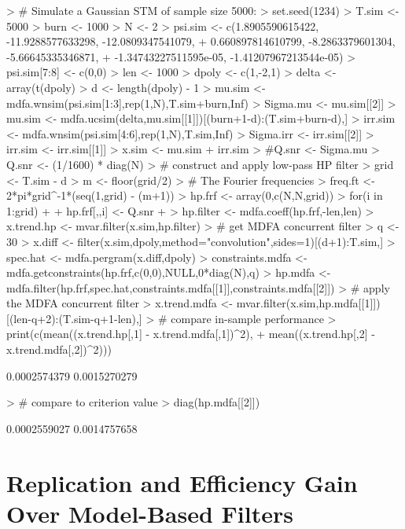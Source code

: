 \documentclass[a4paper]{book}
\begin{document}
\begin{Schunk}
\begin{Sinput}
> # Simulate a Gaussian STM  of sample size 5000:
> set.seed(1234)
> T.sim <- 5000
> burn <- 1000
> N <- 2
> psi.sim <- c(1.8905590615422, -11.9288577633298, -12.0809347541079, 
+              0.660897814610799, -8.2863379601304, -5.66645335346871, 
+              -1.34743227511595e-05, -1.41207967213544e-05)
> psi.sim[7:8] <- c(0,0)
> len <- 1000
> dpoly <- c(1,-2,1)
> delta <- array(t(dpoly) %
> d <- length(dpoly) - 1
> mu.sim <- mdfa.wnsim(psi.sim[1:3],rep(1,N),T.sim+burn,Inf)
> Sigma.mu <- mu.sim[[2]]
> mu.sim <- mdfa.ucsim(delta,mu.sim[[1]])[(burn+1-d):(T.sim+burn-d),]
> irr.sim <- mdfa.wnsim(psi.sim[4:6],rep(1,N),T.sim,Inf)
> Sigma.irr <- irr.sim[[2]]
> irr.sim <- irr.sim[[1]] 
> x.sim <- mu.sim + irr.sim
> #Q.snr <- Sigma.mu %
> Q.snr <- (1/1600) * diag(N)
> # construct and apply low-pass HP filter
> grid <- T.sim - d
> m <- floor(grid/2)
> # The Fourier frequencies
> freq.ft <- 2*pi*grid^{-1}*(seq(1,grid) - (m+1))
> hp.frf <- array(0,c(N,N,grid))
> for(i in 1:grid)
+ {
+   hp.frf[,,i] <- Q.snr %
+ }
> hp.filter <- mdfa.coeff(hp.frf,-len,len)
> x.trend.hp <- mvar.filter(x.sim,hp.filter)
> # get MDFA concurrent filter
> q <- 30
> x.diff <- filter(x.sim,dpoly,method="convolution",sides=1)[(d+1):T.sim,]
> spec.hat <- mdfa.pergram(x.diff,dpoly)
> constraints.mdfa <- mdfa.getconstraints(hp.frf,c(0,0),NULL,0*diag(N),q)
> hp.mdfa <- mdfa.filter(hp.frf,spec.hat,constraints.mdfa[[1]],constraints.mdfa[[2]])
> # apply the MDFA concurrent filter
> x.trend.mdfa <- mvar.filter(x.sim,hp.mdfa[[1]])[(len-q+2):(T.sim-q+1-len),]
> # compare in-sample performance
> print(c(mean((x.trend.hp[,1] - x.trend.mdfa[,1])^2),
+ 	mean((x.trend.hp[,2] - x.trend.mdfa[,2])^2)))
\end{Sinput}
\begin{Soutput}
[1] 0.0002574379 0.0015270279
\end{Soutput}
\begin{Sinput}
> # compare to criterion value
> diag(hp.mdfa[[2]])
\end{Sinput}
\begin{Soutput}
[1] 0.0002559027 0.0014757658
\end{Soutput}
\end{Schunk}
 



\section{Replication and Efficiency Gain Over Model-Based Filters}
\end{document}
